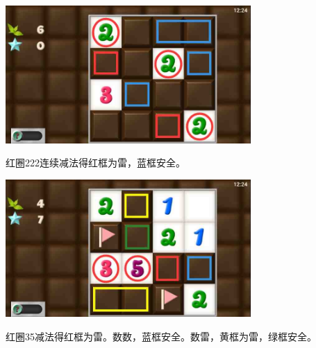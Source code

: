 \subsection{} %
\begin{center}
    \includegraphics[width=0.7\textwidth]{puzzlelow/83-1.jpg}
\end{center}
红圈222连续减法得红框为雷，蓝框安全。
\begin{center}
    \includegraphics[width=0.7\textwidth]{puzzlelow/83-2.jpg}
\end{center}
红圈35减法得红框为雷。数数，蓝框安全。数雷，黄框为雷，绿框安全。

